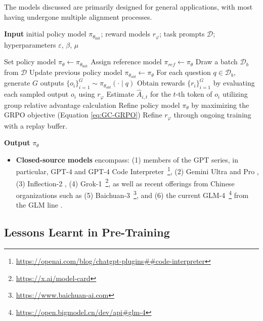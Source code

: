 The models discussed are primarily designed for general applications, with most having undergone multiple alignment processes.

\begin{algorithm}[t]
  \small
  \caption{Iterative Group Relative Policy Optimization}
  \textbf{Input} initial policy model $\pi_{\theta_{\text{init}}}$; reward models $r_\varphi$; task prompts $\mathcal{D}$; 
  hyperparameters $\varepsilon$, $\beta$, $\mu$
  \begin{algorithmic}[1]
    \State Set policy model $\pi_\theta \leftarrow \pi_{\theta_{\text{init}}}$
       \State Assign reference model $\pi_{ref} \leftarrow \pi_{\theta}$
      \State Draw a batch $\mathcal{D}_b$ from $\mathcal{D}$
      \State Update previous policy model $\pi_{\theta_{old}} \leftarrow \pi_{\theta}$
      \State For each question $q \in \mathcal{D}_b$, generate $G$ outputs $\{o_i\}_{i=1}^G \sim \pi_{\theta_{old}} (\cdot \mid q) $
      \State Obtain rewards $\{r_i\}_{i=1}^{G}$ by evaluating each sampled output $o_i$ using $r_{\varphi}$
      \State Estimate $\hat{A}_{i,t}$ for the $t$-th token of $o_i$ utilizing group relative advantage calculation
        \State Refine policy model $\pi_{\theta}$ by maximizing the GRPO objective (Equation \ref{eq:GC-GRPO})
      \EndFor
    \EndFor \State Refine $r_\varphi$ through ongoing training with a replay buffer. 
    \EndFor 
  \end{algorithmic}
  \textbf{Output} $\pi_\theta$
  \label{alg:iter-grpo}
\end{algorithm}

\begin{itemize}[topsep=0pt]
    \item \textbf{Closed-source models} encompass: (1) members of the GPT series, in particular, GPT-4 \citep{gpt4} and GPT-4 Code Interpreter~\footnote{\url{https://openai.com/blog/chatgpt-plugins\#\#code-interpreter}}, (2) Gemini Ultra and Pro \citep{gemini}, (3) Inflection-2 \citep{inflection-2}, (4) Grok-1~\footnote{\url{https://x.ai/model-card}}, as well as recent offerings from Chinese organizations such as (5) Baichuan-3~\footnote{\url{https://www.baichuan-ai.com}}, and (6) the current GLM-4~\footnote{\url{https://open.bigmodel.cn/dev/api\#glm-4}} from the GLM line \citep{glm}.
\end{itemize}

\subsection{Lessons Learnt in Pre-Training}

